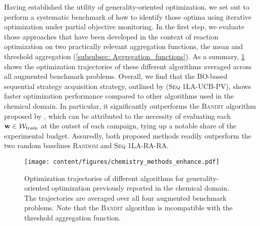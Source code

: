 Having established the utility of generality-oriented optimization, we set out to perform a systematic benchmark of how to identify those optima using iterative optimization under partial objective monitoring.
In the first step, we evaluate those approaches that have been developed in the context of reaction optimization \citep{angello_closed-loop_2022, wang_identifying_2024} on two practically relevant aggregation functions, the mean and threshold aggregation (\cref{subsubsec: Aggregation_functions}). As a summary, \cref{fig:results_average_runs} shows the optimization trajectories of these different algorithms averaged across all augmented benchmark problems.
Overall, we find that the BO-based sequential strategy acquisition strategy,  outlined by \citet{angello_closed-loop_2022} (\textsc{Seq 1LA-UCB-PV}), shows faster optimization performance compared to other algorithms used in the chemical domain.
In particular, it significantly outperforms the \textsc{Bandit} algorithm proposed by \citet{wang_identifying_2024}, which can be attributed to the necessity of evaluating each ${\mathbf{w}} \in \mathcal{W}_{\text{train}}$ at the outset of each campaign, tying up a notable share of the experimental budget.
Assuredly, both proposed methods readily outperform the two random baselines \textsc{Random} and \textsc{Seq 1LA-RA-RA}.

\begin{figure}[t]
    \centering
    \texttt{[image: content/figures/chemistry\_methods\_enhance.pdf]}
    
    \vspace{-1em}
    
    \caption{Optimization trajectories of different algorithms for generality-oriented optimization previously reported in the chemical domain. The trajectories are averaged over all four augmented benchmark problems. Note that the \textsc{Bandit} algorithm is incompatible with the threshold aggregation function.
    }
    \label{fig:results_average_runs}
\end{figure}

